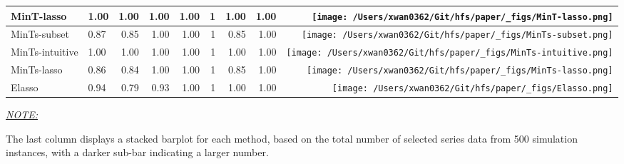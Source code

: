 \documentclass[11pt,a4paper,]{article}
\begin{document}
\begin{table}[!h]
{\begin{threeparttable}
\begin{tabular}{llrrrrrr>{}r}
MinT-lasso & 1.00 & 1.00 & 1.00 & 1.00 & 1 & 1.00 & 1.00 & \texttt{[image: /Users/xwan0362/Git/hfs/paper/\_figs/MinT-lasso.png]}\\
\midrule
MinTs-subset & 0.87 & 0.85 & 1.00 & 1.00 & 1 & 0.85 & 1.00 & \texttt{[image: /Users/xwan0362/Git/hfs/paper/\_figs/MinTs-subset.png]}\\
MinTs-intuitive & 1.00 & 1.00 & 1.00 & 1.00 & 1 & 1.00 & 1.00 & \texttt{[image: /Users/xwan0362/Git/hfs/paper/\_figs/MinTs-intuitive.png]}\\
MinTs-lasso & 0.86 & 0.84 & 1.00 & 1.00 & 1 & 0.85 & 1.00 & \texttt{[image: /Users/xwan0362/Git/hfs/paper/\_figs/MinTs-lasso.png]}\\
\midrule
Elasso & 0.94 & 0.79 & 0.93 & 1.00 & 1 & 1.00 & 1.00 & \texttt{[image: /Users/xwan0362/Git/hfs/paper/\_figs/Elasso.png]}\\
\bottomrule
\end{tabular}
\begin{tablenotes}[para]
\item \underline{\textit{NOTE:}} 
\item The last column displays a stacked barplot for each method, based on the total number of selected series data from 500 simulation instances, with a darker sub-bar indicating a larger number.
\end{tablenotes}
\end{threeparttable}}
\endgroup{}
\end{table}
\end{document}
